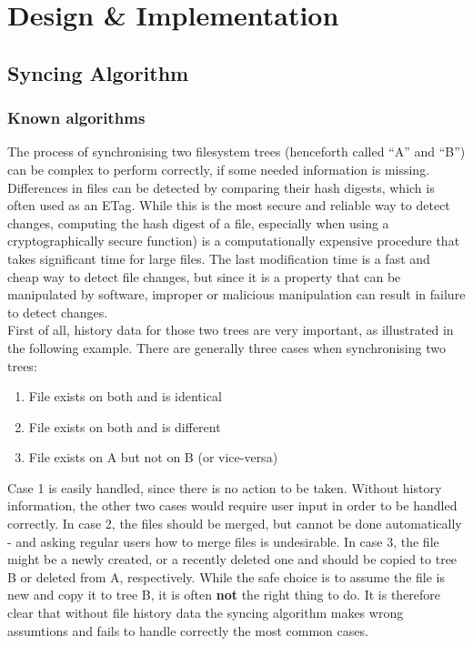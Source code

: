 
\chapter{Design \& Implementation}


\section{Syncing Algorithm}
  \subsection{Known algorithms}
    The process of synchronising two filesystem trees (henceforth called ``A'' and ``B'') can be complex to perform correctly, if some needed information is missing. Differences in files can be detected by comparing their hash digests, which is often used as an ETag. While this is the most secure and reliable way to detect changes, computing the hash digest of a file, especially when using a cryptographically secure function) is a computationally expensive procedure that takes significant time for large files. The last modification time is a fast and cheap way to detect file changes, but since it is a property that can be manipulated by software, improper or malicious manipulation can result in failure to detect changes.\\

     First of all, history data for those two trees are very important, as illustrated in the following example. There are generally three cases when synchronising two trees:
    \begin{enumerate}
      \item File exists on both and is identical
      \item File exists on both and is different
      \item File exists on A but not on B (or vice-versa)
    \end{enumerate}
    Case 1 is easily handled, since there is no action to be taken. Without history information, the other two cases would require user input in order to be handled correctly. In case 2, the files should be merged, but cannot be done automatically - and asking regular users how to merge files is undesirable. In case 3, the file might be a newly created, or a recently deleted one and should be copied to tree B or deleted from A, respectively. While the safe choice is to assume the file is new and copy it to tree B, it is often \textbf{not} the right thing to do. It is therefore clear that without file history data the syncing algorithm makes wrong assumtions and fails to handle correctly the most common cases.\\

